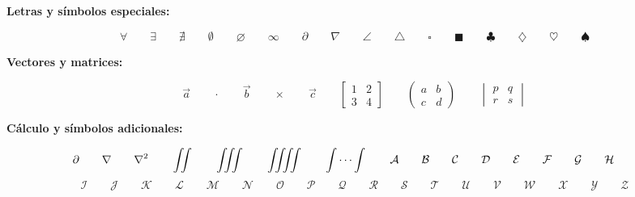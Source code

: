 \documentclass[landscape,15pt]{article}
\begin{document}
\textbf{Letras y símbolos especiales:}

$$\displaystyle \forall \qquad \exists \qquad \nexists \qquad \emptyset \qquad \varnothing \qquad \infty \qquad \partial \qquad \nabla \qquad \angle \qquad \triangle \qquad \square \qquad \blacksquare \qquad \clubsuit \qquad \diamondsuit \qquad \heartsuit \qquad \spadesuit$$

\textbf{Vectores y matrices:}

$$\displaystyle \vec{a} \qquad \cdot \qquad \vec{b} \qquad \times \qquad \vec{c} \qquad \begin{bmatrix} 1 & 2 \\ 3 & 4 \end{bmatrix} \qquad \begin{pmatrix} a & b \\ c & d \end{pmatrix} \qquad \begin{vmatrix} p & q \\ r & s \end{vmatrix}$$

\textbf{Cálculo y símbolos adicionales:}

$$\displaystyle \partial \qquad \nabla \qquad \nabla^2 \qquad \iint \qquad \iiint \qquad \iiiint \qquad \idotsint \qquad  \mathcal{A} \qquad \mathcal{B} \qquad \mathcal{C} \qquad \mathcal{D} \qquad \mathcal{E} \qquad \mathcal{F} \qquad \mathcal{G} \qquad \mathcal{H} \qquad$$
$$ \mathcal{I} \qquad \mathcal{J} \qquad \mathcal{K} \qquad \mathcal{L} \qquad \mathcal{M} \qquad \mathcal{N} \qquad \mathcal{O} \qquad \mathcal{P} \qquad \mathcal{Q} \qquad \mathcal{R} \qquad \mathcal{S} \qquad \mathcal{T} \qquad \mathcal{U} \qquad \mathcal{V} \qquad \mathcal{W} \qquad \mathcal{X} \qquad \mathcal{Y} \qquad \mathcal{Z}$$
\end{document}
